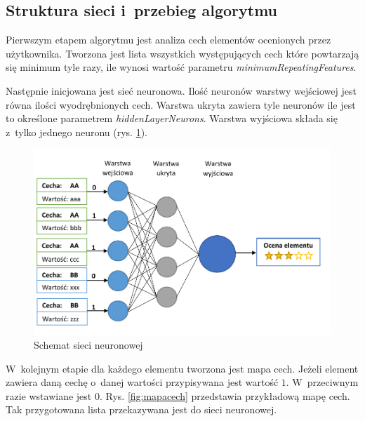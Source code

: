 \documentclass[twoside]{iisthesis}
\begin{document}
	 \subsection{Struktura sieci i~przebieg algorytmu}
	 \label{ss:strukturasiecineuronowej}		 
		 Pierwszym etapem algorytmu jest analiza cech elementów ocenionych przez użytkownika. Tworzona jest lista wszystkich występujących cech które powtarzają się minimum tyle razy, ile wynosi wartość  parametru \textit{minimumRepeatingFeatures}. 
		 
		 Następnie inicjowana jest sieć neuronowa. Ilość neuronów warstwy wejściowej jest równa ilości wyodrębnionych cech. Warstwa ukryta zawiera tyle neuronów ile jest to określone parametrem \textit{hiddenLayerNeurons}. Warstwa wyjściowa składa się z~tylko jednego neuronu (rys. \ref{fig:siecneuronowa}). 
		 
		 \begin{figure}[!ht]
		 	\centering
		 	\includegraphics[width=1\textwidth]{siecneuronowa}
		 	\caption{Schemat sieci neuronowej}
		 	\label{fig:siecneuronowa}
		 \end{figure}
		 
		 W~kolejnym etapie dla każdego elementu tworzona jest mapa cech. Jeżeli element zawiera daną cechę o~danej wartości przypisywana jest wartość $1$. W~przeciwnym razie wstawiane jest $0$. Rys. \ref{fig:mapacech} przedstawia przykładową mapę cech. Tak przygotowana lista przekazywana jest do sieci neuronowej. 
		 
\end{document}
